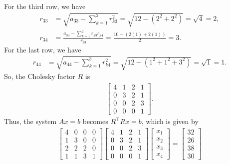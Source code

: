 \documentclass{report}
\begin{document}
    For the third row, we have
    \begin{align*}
        r_{33} &= \sqrt{a_{33} - \sum_{k=1}^{2}r_{k3}^{2}} = \sqrt{12 - (2^{2} + 2^{2})}  = \sqrt{4} = 2, \\
        r_{34} &= \frac{a_{34} - \sum_{k=1}^{2}r_{k3}r_{k4}}{r_{33}} = \frac{10 - (2(1) + 2(1))}{2} = 3
    .\end{align*}
    For the last row, we have
    \begin{align*}
        r_{44} &= \sqrt{a_{44} - \sum_{k=1}^{3}r_{k4}^{2}} = \sqrt{12 -(1^{2} + 1^{2} + 3^{2})} = \sqrt{1} = 1
    .\end{align*}
    So, the Cholesky factor $R$ is 
    \begin{align*}
        \begin{bmatrix}
            4 & 1 & 2 & 1 \\
            0 & 3 & 2 & 1 \\
            0 & 0 & 2 &3 \\
            0 & 0 & 0 & 1
        \end{bmatrix}
    .\end{align*}
    Thus, the system $Ax = b$ becomes $R^{\top}Rx = b$, which is given by
    \begin{align*}
        \begin{bmatrix}
            4 & 0 & 0 & 0 \\
            1 & 3 & 0 & 0\\
            2 & 2 & 2 & 0\\
            1 & 1 & 3 & 1
        \end{bmatrix}
        \begin{bmatrix}
            4 & 1 & 2 & 1 \\
            0 & 3 & 2 & 1 \\
            0 & 0 & 2 &3 \\
            0 & 0 & 0 & 1
        \end{bmatrix}
        \begin{bmatrix}
            x_{1} \\x_{2} \\ x_{3} \\ x_{4}
        \end{bmatrix}
         = 
         \begin{bmatrix}
            32 \\ 26 \\ 38 \\ 30 
         \end{bmatrix}
    \end{align*}
\end{document}
